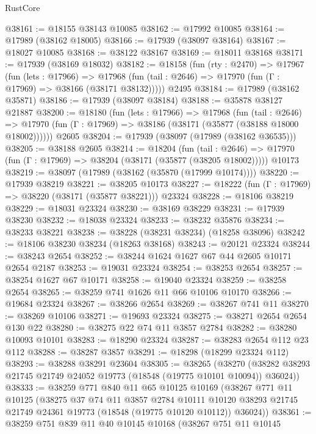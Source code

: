 \begin{lexlean}{RustCore}
\begin{coremodule}
@38161 := @18155 @38143 @10085
@38162 := @17992 @10085
@38164 := @17989 (@38162 @18005)
@38166 := @17939 (@38097 @38164)
@38167 := @18027 @10085
@38168 := @38122 @38167
@38169 := @18011 @38168
@38171 := @17939 (@38169 @18032)
@38182 := @18158
    (fun (rty : @2470) =>
    @17967
      (fun (lets : @17966) =>
      @17968 (fun (tail : @2646) => @17970 (fun (Γ : @17969) => @38166 (@38171 @38132)))))
    @2495
@38184 := @17989 (@38162 @35871)
@38186 := @17939 (@38097 @38184)
@38188 := @35878 @38127 @21887
@38200 := @18180
    (fun (lets : @17966) =>
    @17968
      (fun (tail : @2646) =>
      @17970 (fun (Γ : @17969) => @38186 (@38171 (@35877 (@38188 @18000 @18002))))))
    @2605
@38204 := @17939 (@38097 (@17989 (@38162 @36535)))
@38205 := @38188 @2605
@38214 := @18204
    (fun (tail : @2646) => @17970 (fun (Γ : @17969) => @38204 (@38171 (@35877 (@38205 @18002)))))
    @10173
@38219 := @38097 (@17989 (@38162 (@35870 (@17999 @10174))))
@38220 := @17939 @38219
@38221 := @38205 @10173
@38227 := @18222 (fun (Γ : @17969) => @38220 (@38171 (@35877 @38221))) @23324
@38228 := @18106 @38219
@38229 := @18031 @23324
@38230 := @38169 @38229
@38231 := @17939 @38230
@38232 := @18038 @23324
@38233 := @38232 @35876
@38234 := @38233 @38221
@38238 := @38228 (@38231 @38234) (@18258 @38096)
@38242 := @18106 @38230 @38234 (@18263 @38168)
@38243 := @20121 @23324
@38244 := @38243 @2654
@38252 := @38244 @1624 @1627 @67 @44 @2605 @10171 @2654 @2187
@38253 := @19031 @23324
@38254 := @38253 @2654
@38257 := @38254 @1627 @67 @10171
@38258 := @19040 @23324
@38259 := @38258 @2654
@38265 := @38259 @741 @1626 @11 @66 @10106 @10170
@38266 := @19684 @23324
@38267 := @38266 @2654
@38269 := @38267 @741 @11
@38270 := @38269 @10106
@38271 := @19693 @23324
@38275 := @38271 @2654 @2654 @130 @22
@38280 := @38275 @22 @74 @11 @3857 @2784
@38282 := @38280 @10093 @10101
@38283 := @18290 @23324
@38287 := @38283 @2654 @112 @23 @112
@38288 := @38287 @3857
@38291 := @18298 (@18299 @23324 @112)
@38293 := @38288 @38291 @23604
@38305 := @38265
    (@38270 (@38282 @38293 @21745 @21749 @24052 @19773 (@18548 (@19775 @10101 @10094)) @36024))
@38333 := @38259
    @771
    @840
    @11
    @65
    @10125
    @10169
    (@38267
      @771
      @11
      @10125
      (@38275
        @37
        @74
        @11
        @3857
        @2784
        @10111
        @10120
        @38293
        @21745
        @21749
        @24361
        @19773
        (@18548 (@19775 @10120 @10112))
        @36024))
@38361 := @38259
    @751
    @839
    @11
    @40
    @10145
    @10168
    (@38267
      @751
      @11
      @10145

\end{coremodule}
\end{lexlean}
